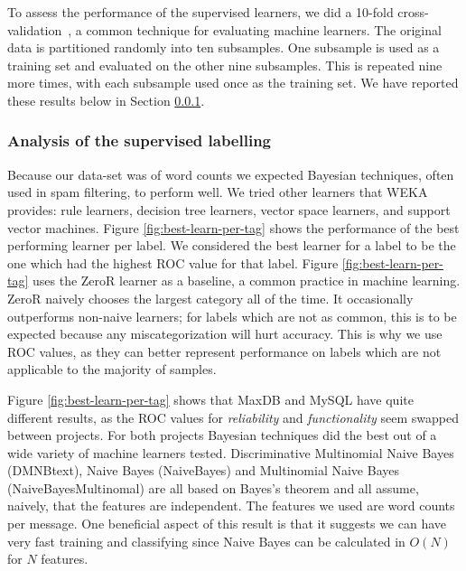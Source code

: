 \documentclass[]{sig-alternate}
\begin{document}
To assess the performance of the supervised learners, we did a 10-fold cross-validation~\cite{Kohavi1995}, a common technique for evaluating machine learners. The original data is partitioned randomly into ten subsamples. One subsample is used as a training set and evaluated on the other nine subsamples. This is repeated nine more times, with each subsample used once as the training set. We have reported these results below in Section \ref{sec:suplabelling}.

\subsubsection{Analysis of the supervised labelling}
\label{sec:suplabelling}
Because our data-set was of word counts we expected Bayesian techniques, often used in spam filtering, to perform well. We tried other learners that WEKA~\cite{weka09} provides: rule learners, decision tree learners, vector space learners, and support vector machines.  Figure \ref{fig:best-learn-per-tag} shows the performance of the best performing learner per label.  We considered the best learner for a label to be the one which had the highest ROC value for that label. Figure \ref{fig:best-learn-per-tag} uses the ZeroR learner as a baseline, a common practice in machine learning. ZeroR naively chooses the largest category all of the time. It occasionally outperforms non-naive learners; for labels which are not as common, this is to be expected because any miscategorization will hurt accuracy. This is why we use ROC values, as they can better represent performance on labels which are not applicable to the majority of samples.

Figure \ref{fig:best-learn-per-tag} shows that MaxDB and MySQL have quite different results, as the ROC values for \emph{reliability} and \emph{functionality} seem swapped between projects. For both projects Bayesian techniques did the best out of a wide variety of machine learners tested. Discriminative Multinomial Naive Bayes (DMNBtext), Naive Bayes (NaiveBayes) and Multinomial Naive Bayes (NaiveBayesMultinomal) are all based on Bayes's theorem and all assume, naively, that the features are independent. The features we used are word counts per message. One beneficial aspect of this result is that it suggests we can have very fast training and classifying  since Naive Bayes can be calculated in $O(N)$ for $N$ features.
\end{document}

